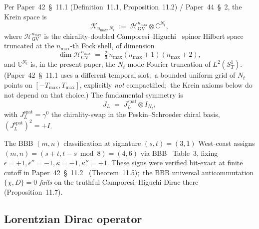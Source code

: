 \documentclass[11pt,a4paper]{article}
\theoremstyle{plain}
\theoremstyle{definition}
\newcommand{\nmax}{n_{\max}}
\newcommand{\Nt}{N_{t}}
\newcommand{\SoneT}{S^{1}_{T}}
\newcommand{\Krein}{\mathcal{K}}
\newcommand{\C}{\mathbb{C}}
\newcommand{\JL}{J_{L}}
\newcommand{\HGV}{\mathcal{H}_{\mathrm{GV}}}
\newcommand{\spat}{\mathrm{spat}}
\begin{document}
Per Paper~42~\cite{paper42}\S~11.1 (Definition~11.1, Proposition~11.2) /
Paper~44~\cite{paper44}\S~2, the
Krein space is
\begin{equation}\label{eq:Krein_def}
   \Krein_{\nmax,\Nt} \;:=\; \HGV^{\nmax} \otimes \C^{\Nt},
\end{equation}
where $\HGV^{\nmax}$ is the chirality-doubled
Camporesi--Higuchi~\cite{camporesi_higuchi1996} spinor Hilbert space
truncated at the $\nmax$-th Fock shell, of dimension
\begin{equation}\label{eq:H_GV_dim}
   \dim\HGV^{\nmax} \;=\; \tfrac{2}{3}\,\nmax(\nmax+1)(\nmax+2),
\end{equation}
and $\C^{\Nt}$ is, in the present paper, the $\Nt$-mode Fourier
truncation of $L^{2}(\SoneT)$.  (Paper~42~\S~11.1 uses a different
temporal slot:\ a bounded uniform grid of $\Nt$ points on
$[-T_{\max}, T_{\max}]$, explicitly \emph{not} compactified;\ the Krein
axioms below do not depend on that choice.) The fundamental symmetry is
\begin{equation}\label{eq:J_def}
   \JL \;=\; \JL^{\spat} \otimes I_{\Nt},
\end{equation}
with $\JL^{\spat} = \gamma^{0}$ the chirality-swap in the
Peskin--Schroeder chiral basis, $(\JL^{\spat})^{2} = +I$.

The BBB $(m, n)$ classification at signature $(s, t) = (3, 1)$
West-coast assigns $(m, n) = (s + t, t - s \bmod 8) = (4, 6)$ via
BBB~\cite{bizi_brouder_besnard2018} Table~3, fixing
$\epsilon = +1, \epsilon'' = -1, \kappa = -1, \kappa'' = +1$. These
signs were verified bit-exact at finite cutoff in
Paper~42~\S~11.2~\cite{paper42} (Theorem~11.5);\ the BBB universal
anticommutation $\{\chi, D\} = 0$ \emph{fails} on the truthful
Camporesi--Higuchi Dirac there (Proposition~11.7).

\subsection{Lorentzian Dirac operator}\label{sec:lorentzian_dirac}
\end{document}
